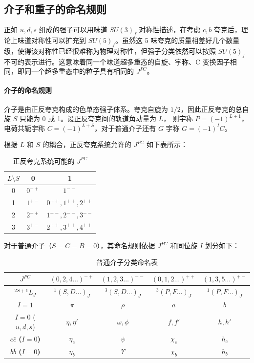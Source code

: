 \subsection{介子和重子的命名规则}
正如 $u, d, s$ 组成的强子可以用味道 $SU(3)_f$ 对称性描述，在考虑 $c, b$ 夸克后，理论上味道对称性可以扩充到 $SU(5)_f$。虽然这 5 味夸克的质量相差好几个数量级，使得该对称性已经很难称为物理对称性，但强子分类依然可以按照 $SU(5)_f$ 不可约表示进行。这意味着同一个味道超多重态的自旋、宇称、C 变换因子相同，即同一个超多重态中的粒子具有相同的 $J^{PC}$。

\paragraph{介子的命名规则}
介子是由正反夸克构成的色单态强子体系。夸克自旋为 $1/2$，因此正反夸克的总自旋 $S$ 只能为 0 或 1。设正反夸克间的轨道角动量为 $L$，
则宇称 $P = (-1)^{L+1}$，电荷共轭宇称 $C = (-1)^{L+S}$，对于普通介子还有 $G$ 宇称 $G = (-1)^I C$。

根据 $L$ 和 $S$ 的耦合，正反夸克系统允许的 $J^{PC}$ 如下表所示：

\begin{table}[H]
    \centering
    \begin{tabular}{|c|c|c|}
    \hline
    \textbf{$L \setminus S$} & \textbf{0} & \textbf{1} \\ \hline
    0 & $0^{-+}$ & $1^{--}$ \\ \hline
    1 & $1^{+-}$ & $0^{++}, 1^{++}, 2^{++}$ \\ \hline
    2 & $2^{-+}$ & $1^{--}, 2^{--}, 3^{--}$ \\ \hline
    3 & $3^{+-}$ & $2^{++}, 3^{++}, 4^{++}$ \\ \hline
    \end{tabular}
    \caption{正反夸克系统可能的 $J^{PC}$}
\end{table}

对于普通介子（$S=C=B=0$），其命名规则依据 $J^{PC}$ 和同位旋 $I$ 划分如下：
\begin{table}[H]
    \centering
    \small
    \renewcommand{\arraystretch}{1.5}
    \begin{tabular}{|c|c|c|c|c|}
    \hline
    \textbf{$J^{PC}$} & \textbf{$(0,2,4\dots)^{-+}$} & \textbf{$(1,2,3\dots)^{--}$} & \textbf{$(0,1,2\dots)^{++}$} & \textbf{$(1,3,5\dots)^{+-}$} \\ \hline
    \textbf{$^{2S+1}L_J$} & $^1(S,D\dots)_J$ & $^3(S,D\dots)_J$ & $^3(P,F\dots)_J$ & $^1(P,F\dots)_J$ \\ \hline
    \textbf{$I=1$} & $\pi$ & $\rho$ & $a$ & $b$ \\ \hline
    \textbf{$I=0$} ($u,d,s$) & $\eta, \eta'$ & $\omega, \phi$ & $f, f'$ & $h, h'$ \\ \hline
    \textbf{$c\bar{c}$ ($I=0$)} & $\eta_c$ & $\psi$ & $\chi_c$ & $h_c$ \\ \hline
    \textbf{$b\bar{b}$ ($I=0$)} & $\eta_b$ & $\Upsilon$ & $\chi_b$ & $h_b$ \\ \hline
    \end{tabular}
    \caption{普通介子分类命名表}
\end{table}

